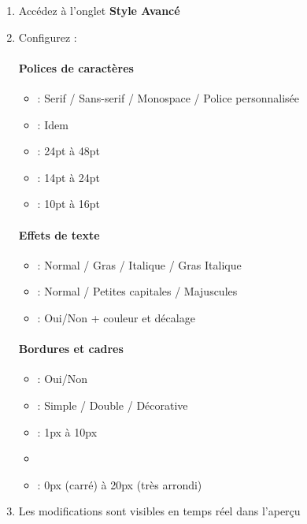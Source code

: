\begin{enumerate}[leftmargin=*]
    \item Accédez à l'onglet \textbf{Style Avancé}
    \item Configurez :

    \paragraph{Polices de caractères}
    \begin{itemize}
        \item {} : Serif / Sans-serif / Monospace / Police personnalisée
        \item {} : Idem
        \item {} : 24pt à 48pt
        \item {} : 14pt à 24pt
        \item {} : 10pt à 16pt
    \end{itemize}

    \paragraph{Effets de texte}
    \begin{itemize}
        \item {} : Normal / Gras / Italique / Gras Italique
        \item {} : Normal / Petites capitales / Majuscules
        \item {} : Oui/Non + couleur et décalage
    \end{itemize}

    \paragraph{Bordures et cadres}
    \begin{itemize}
        \item {} : Oui/Non
        \item {} : Simple / Double / Décorative
        \item {} : 1px à 10px
        \item {}
        \item {} : 0px (carré) à 20px (très arrondi)
    \end{itemize}

    \item Les modifications sont visibles en temps réel dans l'aperçu
\end{enumerate}

